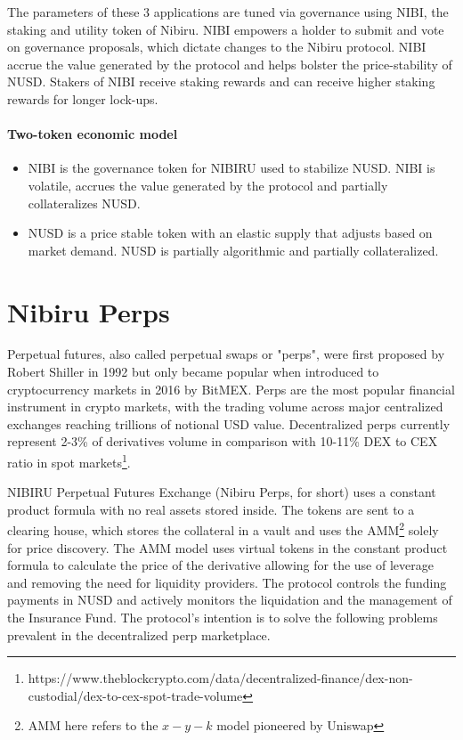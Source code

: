 \documentclass[11pt]{article}
\begin{document}
The parameters of these 3 applications are tuned via governance using NIBI, the staking and utility token of Nibiru. NIBI empowers a holder to submit and vote on governance proposals, which dictate changes to the Nibiru protocol. NIBI accrue the value generated by the protocol and helps bolster the price-stability of NUSD. Stakers of NIBI receive staking rewards and can receive higher staking rewards for longer lock-ups. 

\subsection*{Two-token economic model}
\begin{itemize}
\item NIBI is the governance token for NIBIRU used to stabilize NUSD. NIBI is volatile, accrues the value generated by the protocol and partially collateralizes NUSD.
\item NUSD is a price stable token with an elastic supply that adjusts based on market demand. NUSD is partially algorithmic and partially collateralized.
\vfill
  
\end{itemize}

\twocolumn
\part{Nibiru Perps}\label{x/perp}

Perpetual futures, also called perpetual swaps or "perps", were first proposed by Robert Shiller in 1992 but only became popular when introduced to cryptocurrency markets in 2016 by BitMEX. Perps are the most popular financial instrument in crypto markets, with the trading volume across major centralized exchanges reaching trillions of notional USD value. Decentralized perps currently represent 2-3\% of derivatives volume in comparison with 10-11\% DEX to CEX ratio in spot markets\footnote{ https://www.theblockcrypto.com/data/decentralized-finance/dex-non-custodial/dex-to-cex-spot-trade-volume}.

NIBIRU Perpetual Futures Exchange (Nibiru Perps, for short) uses a constant product formula with no real assets stored inside. The tokens are sent to a clearing house, which stores the collateral in a vault and uses the AMM\footnote{AMM here refers to the $x-y-k$ model pioneered by Uniswap} solely for price discovery. The AMM model uses virtual tokens in the constant product formula to calculate the price of the derivative allowing for the use of leverage and removing the need for liquidity providers. The protocol controls the funding payments in NUSD and actively monitors the liquidation and the management of the Insurance Fund. The protocol’s intention is to solve the following problems prevalent in the decentralized perp marketplace. 
\end{document}
